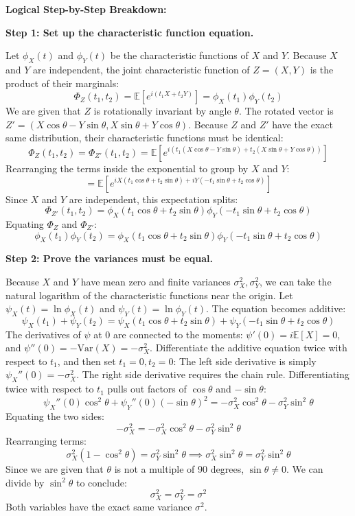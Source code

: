 \begin{solution}
\textbf{Logical Step-by-Step Breakdown:}

\textbf{Step 1: Set up the characteristic function equation.}

Let $\phi_X(t)$ and $\phi_Y(t)$ be the characteristic functions of $X$ and $Y$. Because $X$ and $Y$ are independent, the joint characteristic function of $Z = (X, Y)$ is the product of their marginals:
\[ \Phi_Z(t_1, t_2) = \mathbb{E}[e^{i(t_1 X + t_2 Y)}] = \phi_X(t_1) \phi_Y(t_2) \]
We are given that $Z$ is rotationally invariant by angle $\theta$. The rotated vector is $Z' = (X \cos \theta - Y \sin \theta, X \sin \theta + Y \cos \theta)$.
Because $Z$ and $Z'$ have the exact same distribution, their characteristic functions must be identical:
\[ \Phi_Z(t_1, t_2) = \Phi_{Z'}(t_1, t_2) = \mathbb{E}[e^{i(t_1(X \cos \theta - Y \sin \theta) + t_2(X \sin \theta + Y \cos \theta))}] \]
Rearranging the terms inside the exponential to group by $X$ and $Y$:
\[ = \mathbb{E}[e^{iX(t_1 \cos \theta + t_2 \sin \theta) + iY(-t_1 \sin \theta + t_2 \cos \theta)}] \]
Since $X$ and $Y$ are independent, this expectation splits:
\[ \Phi_{Z'}(t_1, t_2) = \phi_X(t_1 \cos \theta + t_2 \sin \theta) \phi_Y(-t_1 \sin \theta + t_2 \cos \theta) \]
Equating $\Phi_Z$ and $\Phi_{Z'}$:
\[ \phi_X(t_1) \phi_Y(t_2) = \phi_X(t_1 \cos \theta + t_2 \sin \theta) \phi_Y(-t_1 \sin \theta + t_2 \cos \theta) \]

\textbf{Step 2: Prove the variances must be equal.}

Because $X$ and $Y$ have mean zero and finite variances $\sigma_X^2, \sigma_Y^2$, we can take the natural logarithm of the characteristic functions near the origin. Let $\psi_X(t) = \ln \phi_X(t)$ and $\psi_Y(t) = \ln \phi_Y(t)$.
The equation becomes additive:
\[ \psi_X(t_1) + \psi_Y(t_2) = \psi_X(t_1 \cos \theta + t_2 \sin \theta) + \psi_Y(-t_1 \sin \theta + t_2 \cos \theta) \]
The derivatives of $\psi$ at 0 are connected to the moments: $\psi'(0) = i\mathbb{E}[X] = 0$, and $\psi''(0) = -\text{Var}(X) = -\sigma_X^2$.
Differentiate the additive equation twice with respect to $t_1$, and then set $t_1=0, t_2=0$:
The left side derivative is simply $\psi_X''(0) = -\sigma_X^2$.
The right side derivative requires the chain rule. Differentiating twice with respect to $t_1$ pulls out factors of $\cos \theta$ and $-\sin \theta$:
\[ \psi_X''(0) \cos^2 \theta + \psi_Y''(0) (-\sin \theta)^2 = -\sigma_X^2 \cos^2 \theta - \sigma_Y^2 \sin^2 \theta \]
Equating the two sides:
\[ -\sigma_X^2 = -\sigma_X^2 \cos^2 \theta - \sigma_Y^2 \sin^2 \theta \]
Rearranging terms:
\[ \sigma_X^2 (1 - \cos^2 \theta) = \sigma_Y^2 \sin^2 \theta \implies \sigma_X^2 \sin^2 \theta = \sigma_Y^2 \sin^2 \theta \]
Since we are given that $\theta$ is not a multiple of 90 degrees, $\sin \theta \neq 0$. We can divide by $\sin^2 \theta$ to conclude:
\[ \sigma_X^2 = \sigma_Y^2 = \sigma^2 \]
Both variables have the exact same variance $\sigma^2$.


\end{solution}
